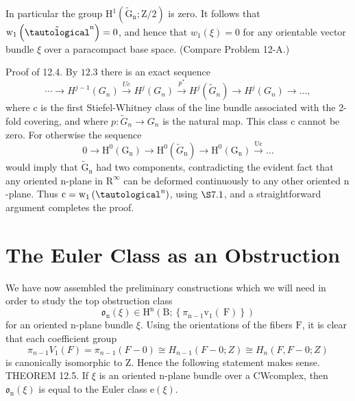 \documentclass[10pt]{article}
\begin{document}
In particular the group $\mathrm{H}^{1}\left(\widetilde{\mathrm{G}}_{\mathrm{n}} ; \mathrm{Z} / 2\right)$ is zero. It follows that $\mathrm{w}_{1}\left(\tilde{\tautological}^{\mathrm{n}}\right)=0$, and hence that $w_{1}(\xi)=0$ for any orientable vector bundle $\xi$ over a paracompact base space. (Compare Problem 12-A.)

Proof of 12.4. By $12.3$ there is an exact sequence
$$
\cdots \longrightarrow H^{j-1}\left(G_{n}\right) \stackrel{U c}{\longrightarrow} H^{j}\left(G_{n}\right) \stackrel{p^{*}}{\longrightarrow} H^{j}\left(\widetilde{G}_{n}\right) \longrightarrow H^{j}\left(G_{n}\right) \longrightarrow \ldots,
$$
where $\mathrm{c}$ is the first Stiefel-Whitney class of the line bundle associated with the 2-fold covering, and where $p: \widetilde{G}_{n} \rightarrow G_{n}$ is the natural map. This class c cannot be zero. For otherwise the sequence
$$
0 \longrightarrow \mathrm{H}^{0}\left(\mathrm{G}_{\mathrm{n}}\right) \longrightarrow \mathrm{H}^{0}\left(\tilde{G}_{\mathrm{n}}\right) \longrightarrow \mathrm{H}^{0}\left(\mathrm{G}_{\mathrm{n}}\right) \stackrel{\mathrm{Uc}}{\longrightarrow} \ldots
$$
would imply that $\tilde{\mathrm{G}}_{\mathrm{n}}$ had two components, contradicting the evident fact that any oriented $\mathrm{n}$-plane in $\mathrm{R}^{\infty}$ can be deformed continuously to any other oriented $\mathrm{n}$-plane. Thus $\mathrm{c}=\mathrm{w}_{1}\left(\tautological^{\mathrm{n}}\right)$, using $\S 7.1$, and a straightforward argument completes the proof.

\section{The Euler Class as an Obstruction}
We have now assembled the preliminary constructions which we will need in order to study the top obstruction class
$$
\mathfrak{o}_{\mathrm{n}}(\xi) \in \mathrm{H}^{\mathrm{n}}\left(\mathrm{B} ;\left\{\pi_{\mathrm{n}-1} \mathrm{v}_{1}(\mathrm{~F})\right\}\right)
$$
for an oriented $\mathrm{n}$-plane bundle $\xi$. Using the orientations of the fibers $\mathrm{F}$, it is clear that each coefficient group
$$
\pi_{n-1} V_{1}(F)=\pi_{n-1}(F-0) \cong H_{n-1}(F-0 ; Z) \cong H_{n}(F, F-0 ; Z)
$$
is canonically isomorphic to $\mathrm{Z}$. Hence the following statement makes sense. THEOREM 12.5. If $\xi$ is an oriented $\mathrm{n}$-plane bundle over a CWcomplex, then $\mathfrak{o}_{\mathrm{n}}(\xi)$ is equal to the Euler class $\mathrm{e}(\xi)$.
\end{document}
